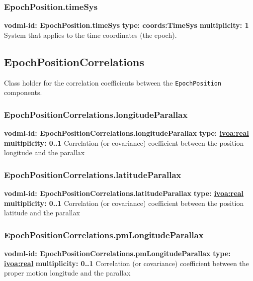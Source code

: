     \subsubsection{EpochPosition.timeSys}
      \textbf{vodml-id: EpochPosition.timeSys} \newline
      \textbf{type: coords:TimeSys} \newline
      \textbf{multiplicity: 1} \newline
      System that applies to the time coordinates (the epoch).

  \subsection{EpochPositionCorrelations}
  \label{sect:EpochPositionCorrelations}
    Class holder for the correlation coefficients between the \texttt{EpochPosition} components.

    \subsubsection{EpochPositionCorrelations.longitudeParallax}
      \textbf{vodml-id: EpochPositionCorrelations.longitudeParallax} \newline
      \textbf{type: \hyperref[sect:ivoa]{ivoa:real}} \newline
      \textbf{multiplicity: 0..1} \newline
      Correlation (or covariance) coefficient between the position longitude and the parallax

    \subsubsection{EpochPositionCorrelations.latitudeParallax}
      \textbf{vodml-id: EpochPositionCorrelations.latitudeParallax} \newline
      \textbf{type: \hyperref[sect:ivoa]{ivoa:real}} \newline
      \textbf{multiplicity: 0..1} \newline
      Correlation (or covariance) coefficient between the position latitude and the parallax

    \subsubsection{EpochPositionCorrelations.pmLongitudeParallax}
      \textbf{vodml-id: EpochPositionCorrelations.pmLongitudeParallax} \newline
      \textbf{type: \hyperref[sect:ivoa]{ivoa:real}} \newline
      \textbf{multiplicity: 0..1} \newline
      Correlation (or covariance) coefficient between the proper motion longitude and the parallax

